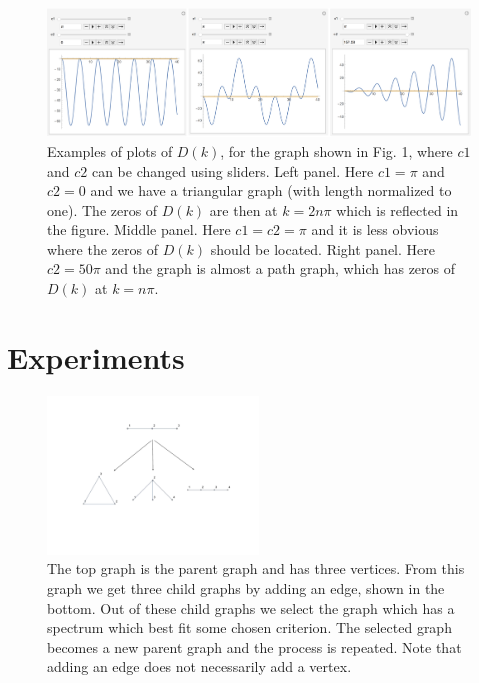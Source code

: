 \documentclass[a4paper]{article}
\begin{document}
\begin{figure}
\centering
\includegraphics[width=1.0\textwidth]{all.pdf}
\caption{\label{fig:all}Examples of plots of $D(k)$, for the graph shown in Fig. 1, where $c1$ and $c2$ can be changed using sliders. Left panel. Here $c1=\pi$ and $c2=0$ and we have a triangular graph (with length normalized to one). The zeros of $D(k)$ are then at $k=2n\pi$ which is reflected in the figure. Middle panel. Here $c1=c2=\pi$ and it is less obvious where the zeros of $D(k)$ should be located. Right panel. Here $c2=50\pi$ and the graph is almost a path graph, which has zeros of $D(k)$ at $k=n\pi$.}
\end{figure}

\section{Experiments}


\begin{figure}
\centering
\includegraphics[width=0.5\textwidth]{Parent-child.pdf}
\caption{\label{Parent-child:all}The top graph is the parent graph and has three vertices. From this graph we get three child graphs by adding an edge, shown in the bottom. Out of these child graphs we select the graph which has a spectrum which best fit some chosen criterion. The selected graph becomes a new parent graph and the process is repeated. Note that adding an edge does not necessarily add a vertex.}
\end{figure}
\end{document}
